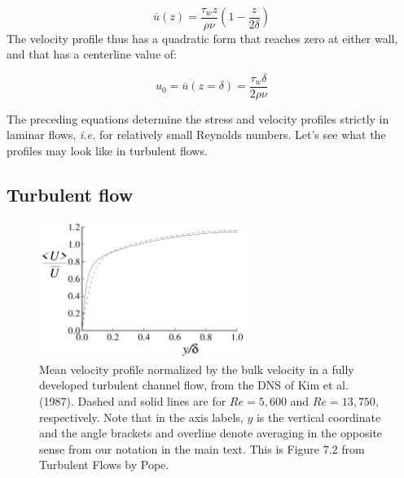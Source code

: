 \documentclass[12pt]{article}
\numberwithin{equation}{section}
\numberwithin{figure}{section}
\numberwithin{table}{section}
\begin{document}
\begin{equation}
  \overline{u}(z) = \frac{\tau_w z}{\rho \nu} \left(1 - \frac{z}{2\delta} \right)
\end{equation}
The velocity profile thus has a quadratic form that reaches zero at either wall,
and that has a centerline value of:

\begin{equation}
  u_0 = \overline{u}(z=\delta) = \frac{\tau_w \delta}{2 \rho \nu}
\end{equation}

The preceding equations determine the stress and velocity profiles strictly in
laminar flows, \textit{i.e.} for relatively small Reynolds numbers.
Let's see what the profiles may look like in turbulent flows.

\subsection{Turbulent flow}

\begin{figure}[h]
  \centering
  \includegraphics[width=0.6\textwidth]{assets/fig_channel_flow_turbulent_u.png}
  \caption{
    Mean velocity profile normalized by the bulk velocity in a fully developed
    turbulent channel flow, from the DNS of Kim et al. (1987).
    Dashed and solid lines are for $Re = 5,600$ and $Re = 13,750$, respectively.
    Note that in the axis labels, $y$ is the vertical coordinate and the
    angle brackets and overline denote averaging in the opposite sense from
    our notation in the main text.
    This is Figure 7.2 from Turbulent Flows by Pope.
  }
  \label{fig:channel_flow_turbulent_u}
\end{figure}
\end{document}
